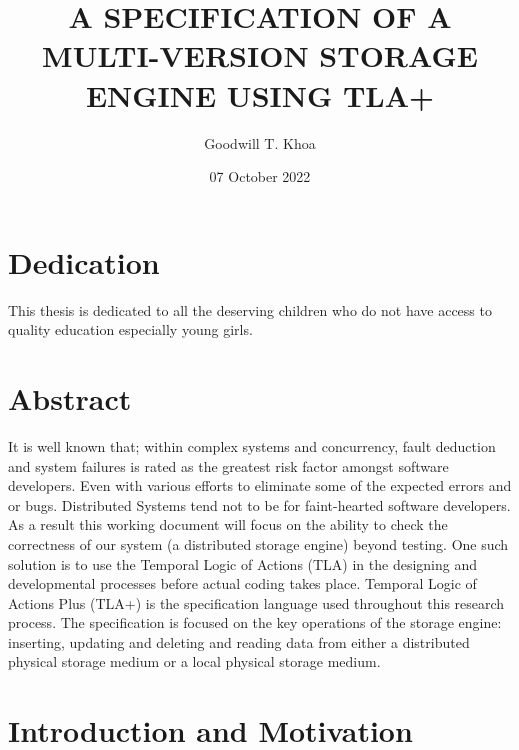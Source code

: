 \documentclass[11pt,a4paper,oneside]{book} %
\title{A SPECIFICATION OF A MULTI-VERSION STORAGE ENGINE USING TLA+}
\author{Goodwill T. Khoa}
\date{ 07 October 2022}
\numberwithin{equation}{section}
\begin{document}
\maketitle

\thesisAcceptanceCertificate
\evaluationcommitteeapproval{ }{ }{ }

\chapter*{Dedication}
This thesis is dedicated to all the deserving children who do not have access to quality education especially young girls.

\certificateoforiginality


\tableofcontents
\listoffigures
\listoftables

\chapter*{Abstract}
It is well known that; within complex systems and concurrency, fault deduction and system
failures is rated as the greatest risk factor amongst software developers. Even with various
efforts to eliminate some of the expected errors and or bugs. Distributed Systems tend not to
be for faint-hearted software developers. As a result this working document will focus on the
ability to check the correctness of our system (a distributed storage engine) beyond testing.
One such solution is to use the Temporal Logic of Actions (TLA) in the designing and developmental processes before actual coding takes place.  Temporal Logic of Actions Plus (TLA+) is the specification
language used throughout this research process. The specification is focused on the key
operations of the storage engine: inserting, updating and deleting and reading data from either a distributed physical storage medium or a local physical storage medium.

\resetpagenumbering

\chapter{Introduction and Motivation}\label{c-intro}
\end{document}
